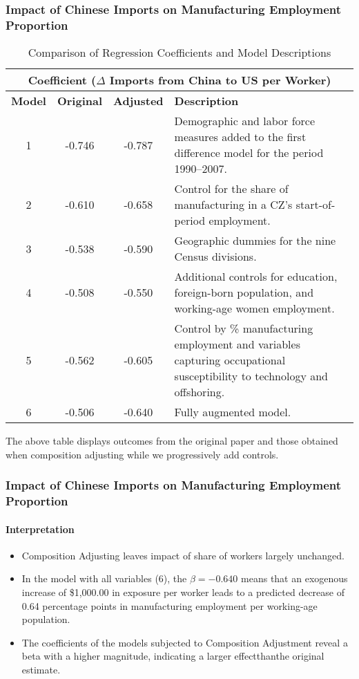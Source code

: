 \begin{frame}
    \frametitle{Impact of Chinese Imports on Manufacturing Employment Proportion}
    \begin{table}[h!]
        \centering
        \begin{adjustbox}{max width=\textwidth}
            \begin{tabular}{c c c >{\raggedright\arraybackslash}p{8cm}}
                \toprule
                \multicolumn{4}{c}{\textbf{Coefficient ($\Delta$ Imports from China to US per Worker)}} \\
                \midrule
                \textbf{Model} & \textbf{Original} & \textbf{Adjusted} & \textbf{Description} \\
                \midrule
                1 & -0.746 & -0.787 & Demographic and labor force measures added to the first difference model for the period 1990–2007. \\
                2 & -0.610 & -0.658 & Control for the share of manufacturing in a CZ's start-of-period employment. \\
                3 & -0.538 & -0.590 & Geographic dummies for the nine Census divisions. \\
                4 & -0.508 & -0.550 & Additional controls for education, foreign-born population, and working-age women employment. \\
                5 & -0.562 & -0.605 & Control by \% manufacturing employment and variables capturing occupational susceptibility to technology and offshoring. \\
                6 & -0.506 & -0.640 & Fully augmented model. \\
                \bottomrule
            \end{tabular}
        \end{adjustbox}
        \caption{Comparison of Regression Coefficients and Model Descriptions}
        \label{tab:comparison_coeff}
    \end{table}

    The above table displays outcomes from the original paper and those obtained when composition adjusting while we progressively add controls.
\end{frame}
\begin{frame}
    \frametitle{Impact of Chinese Imports on Manufacturing Employment Proportion}
    \framesubtitle{Interpretation}
    \begin{itemize}
        \item Composition Adjusting leaves impact of share of workers largely unchanged.
        \item In the model with all variables (6), the $\beta = -0.640$ means that an exogenous increase of \$1,000.00 in exposure per worker leads to a predicted decrease of 0.64 percentage points in manufacturing employment per working-age population.
        \item The coefficients of the models subjected to Composition Adjustment reveal a beta with a higher magnitude, indicating a larger effectthanthe original estimate.
    \end{itemize}
\end{frame}

